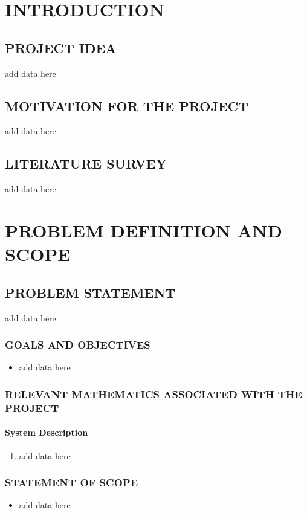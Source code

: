 \documentclass[12pt,a4paper]{report}
\begin{document}
\chapter{\textbf{INTRODUCTION}}
\section{PROJECT IDEA}
add data here

\section{MOTIVATION FOR THE PROJECT}
add data here

\section{LITERATURE SURVEY}

add data here

\chapter{PROBLEM DEFINITION AND SCOPE}
\section{PROBLEM STATEMENT}
add data here
\subsection{GOALS AND OBJECTIVES}
\begin{itemize}
\item add data here
\end{itemize}

\subsection{RELEVANT MATHEMATICS ASSOCIATED WITH THE PROJECT}
\subsubsection{System Description}
\begin{enumerate}
\item add data here
\end{enumerate}


\subsection{STATEMENT OF SCOPE}
\begin{itemize}
\item add data here
\end{itemize}
\end{document}
